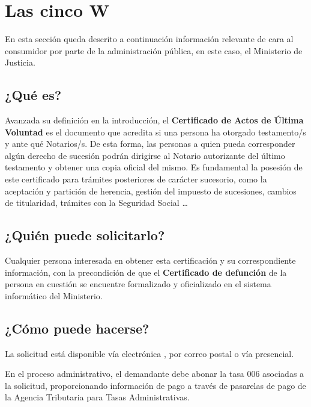 \section{Las cinco W}

En esta sección queda descrito a continuación información relevante de cara al consumidor por parte de la administración pública, en este caso, el Ministerio de Justicia.

\subsection{¿Qué es?}\label{subsec:what}
Avanzada su definición en la introducción, el \textbf{Certificado de Actos de Última Voluntad} es el documento que acredita si una persona ha otorgado testamento/s y ante qué Notarios/s. De esta forma, las personas a quien pueda corresponder algún derecho de sucesión podrán dirigirse al Notario autorizante del último testamento y obtener una copia oficial del mismo. Es fundamental la posesión de este certificado para trámites posteriores de carácter sucesorio, como la aceptación y partición de herencia, gestión del impuesto de sucesiones, cambios de titularidad, trámites con la Seguridad Social \dots

\subsection{¿Quién puede solicitarlo?}
Cualquier persona interesada en obtener esta certificación y su correspondiente información, con la precondición de que el \textbf{Certificado de defunción} de la persona en cuestión se encuentre formalizado y oficializado en el sistema informático del Ministerio.

\subsection{¿Cómo puede hacerse?}
La solicitud está disponible vía electrónica \cite{solicitud}, por correo postal o vía presencial. 

En el proceso administrativo, el demandante debe abonar la tasa 006 asociadas a la solicitud, proporcionando información de pago a través de pasarelas de pago de la Agencia Tributaria para Tasas Administrativas. 

